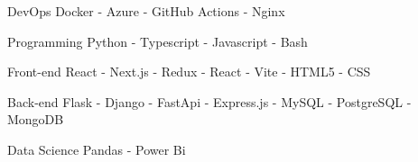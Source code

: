 

\begin{cvskills}

  \cvskill
    {DevOps} %
    {Docker - Azure - GitHub Actions - Nginx} %

  \cvskill
    {Programming} %
    {Python - Typescript - Javascript - Bash} %

  \cvskill
      {Front-end} %
      {React - Next.js - Redux - React - Vite - HTML5 - CSS} %

  \cvskill
    {Back-end} %
    {Flask - Django - FastApi - Express.js -  MySQL - PostgreSQL - MongoDB} %

  \cvskill
    {Data Science} %
    {Pandas - Power Bi} %

\end{cvskills}
